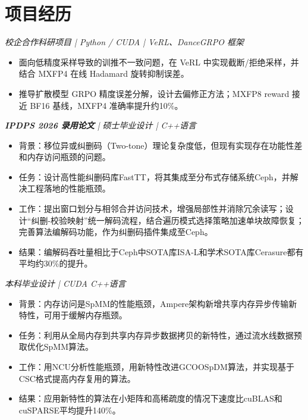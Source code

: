 
\section{项目经历}
\textit{校企合作科研项目 | Python / CUDA | VeRL、DanceGRPO 框架}
\begin{itemize}
\item 面向低精度采样导致的训推不一致问题，在 VeRL 中实现截断/拒绝采样，并结合 MXFP4 在线 Hadamard 旋转抑制误差。
\item 推导扩散模型 GRPO 精度误差分解，设计去偏修正方法；MXFP8 reward 接近 BF16 基线，MXFP4 准确率提升约10\%。
\end{itemize}
\textit{\textbf{IPDPS 2026 录用论文} | 硕士毕业设计 | C++语言}
\begin{itemize}
\item 背景：移位异或纠删码（Two-tone）理论复杂度低，但现有实现存在功能性差和内存访问瓶颈的问题。
\item 任务：设计高性能纠删码库FastTT，将其集成至分布式存储系统Ceph，并解决工程落地的性能瓶颈。
\item 工作：提出窗口划分与相邻合并访问技术，增强局部性并消除冗余读写；设计“纠删-校验映射”统一解码流程，结合遍历模式选择策略加速单块故障恢复；完善算法编解码功能，作为纠删码插件集成至Ceph。
\item 结果：编解码吞吐量相比于Ceph中SOTA库ISA-L和学术SOTA库Cerasure都有平均约30\%的提升。
\end{itemize}
\textit{本科毕业设计 | CUDA C++语言}
\begin{itemize}
  \item 背景：内存访问是SpMM的性能瓶颈，Ampere架构新增共享内存异步传输新特性，可用于缓解内存瓶颈。
  \item 任务：利用从全局内存到共享内存异步数据拷贝的新特性，通过流水线数据预取优化SpMM算法。
  \item 工作：用NCU分析性能瓶颈，用新特性改进GCOOSpDM算法，并实现基于CSC格式提高内存复用的算法。
  \item 结果：应用新特性的算法在小矩阵和高稀疏度的情况下速度比cuBLAS和cuSPARSE平均提升140\%。
\end{itemize}
